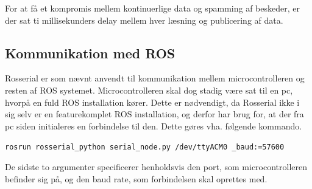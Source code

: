 For at få et kompromis mellem kontinuerlige data og spamming af beskeder, er der sat ti millisekunders delay mellem hver læsning og publicering af data. 

\subsection{Kommunikation med ROS}
Rosserial er som nævnt anvendt til kommunikation mellem microcontrolleren og resten af ROS systemet. Microcontrolleren skal dog stadig være sat til en pc, hvorpå en fuld ROS installation kører. Dette er nødvendigt, da Rosserial ikke i sig selv er en featurekomplet ROS installation, og derfor har brug for, at der fra pc siden initialeres en forbindelse til den. Dette gøres vha. følgende kommando. 

	\texttt{rosrun rosserial\_python serial\_node.py /dev/ttyACM0 \_baud:=57600}
	
	De sidste to argumenter specificerer henholdsvis den port, som microcontrolleren befinder sig på, og den baud rate, som forbindelsen skal oprettes med.










